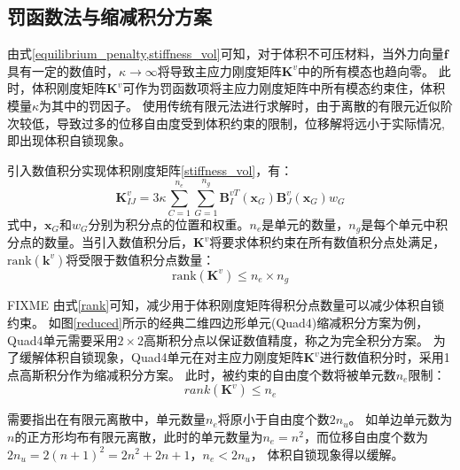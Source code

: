 \subsection{罚函数法与缩减积分方案}
由式\eqref{equilibrium_penalty,stiffness_vol}可知，对于体积不可压材料，当外力向量$\boldsymbol f$具有一定的数值时，$\kappa \rightarrow \infty$将导致主应力刚度矩阵$\boldsymbol K^v$中的所有模态也趋向零。
此时，体积刚度矩阵$\boldsymbol K^v$可作为罚函数项将主应力刚度矩阵中所有模态约束住，体积模量$\kappa$为其中的罚因子。
使用传统有限元法进行求解时，由于离散的有限元近似阶次较低，导致过多的位移自由度受到体积约束的限制，位移解将远小于实际情况,即出现体积自锁现象。

引入数值积分实现体积刚度矩阵\eqref{stiffness_vol}，有：
\begin{equation}\label{integration}
    \boldsymbol K^v_{IJ} =  3\kappa \sum_{C=1}^{n_e}\sum_{G=1}^{n_g} \boldsymbol B^{vT}_I(\boldsymbol x_G) \boldsymbol B^v_J(\boldsymbol x_G) w_G
\end{equation}
式中，$\boldsymbol x_G$和$w_G$分别为积分点的位置和权重。$n_e$是单元的数量，$n_g$是每个单元中积分点的数量。当引入数值积分后，$\boldsymbol K^v$将要求体积约束在所有数值积分点处满足，$\mathrm{rank}(\boldsymbol k^v)$将受限于数值积分点数量：
\begin{equation}\label{rank}
    \mathrm{rank}(\boldsymbol K^v)\le n_e \times n_g
\end{equation}

FIXME
由式\eqref{rank}可知，减少用于体积刚度矩阵得积分点数量可以减少体积自锁约束。
如图\ref{reduced}所示的经典二维四边形单元(Quad4)缩减积分方案为例，Quad4单元需要采用$2\times2$高斯积分点以保证数值精度，称之为完全积分方案。
为了缓解体积自锁现象，Quad4单元在对主应力刚度矩阵$\boldsymbol K^v$进行数值积分时，采用1点高斯积分作为缩减积分方案。
此时，被约束的自由度个数将被单元数$n_e$限制：
\begin{equation}
    \mathit{rank}(\boldsymbol K^v)\le n_e
\end{equation}

需要指出在有限元离散中，单元数量$n_e$将原小于自由度个数$2n_u$。
如单边单元数为$n$的正方形均布有限元离散，此时的单元数量为$n_e = n^2$，而位移自由度个数为$2n_u = 2(n+1)^2 = 2n^2+2n+1$，$n_e < 2n_u$，
体积自锁现象得以缓解。

